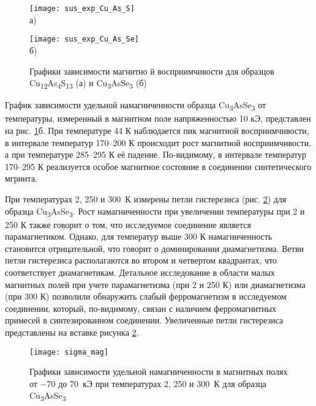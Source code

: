 \begin{figure}[p!]
  \begin{minipage}[ht]{0.9\linewidth}\centering
    \texttt{[image: sus\_exp\_Cu\_As\_S]} \\ а)
  \end{minipage}
 \vfill
  \begin{minipage}[ht]{0.9\linewidth}\centering
    \texttt{[image: sus\_exp\_Cu\_As\_Se]} \\ б)
  \end{minipage}
      \caption[Графики зависимости магнитно	й восприимчивости для образцов Cu\textsubscript{12}As\textsubscript{4}Se\textsubscript{13} (а) и Cu\textsubscript{3}AsS\textsubscript{3} (б)]{Графики зависимости магнитно	й восприимчивости для образцов Cu\textsubscript{12}As\textsubscript{4}S\textsubscript{13} (а) и Cu\textsubscript{3}AsSe\textsubscript{3} (б)}
    \label{img:magsus1}
\end{figure}

График зависимости удельной намагниченности образца Cu\textsubscript{3}AsSe\textsubscript{3} от температуры, измеренный в магнитном поле напряженностью 10 кЭ, представлен на рис. \ref{img:magsus1}б.
При температуре 44 К наблюдается пик магнитной восприимчивости, в интервале температур 170--200 К происходит рост магнитной восприимчивости, а при температуре 285--295 К её падение.
По-видимому, в интервале температур 170--295 К реализуется особое магнитное состояние в соединении синтетического мгриита.

При температурах 2, 250 и 300~К измерены петли гистерезиса (рис. \ref{img:magsus3}) для образца Cu\textsubscript{3}AsSe\textsubscript{3}.
Рост намагниченности при увеличении температуры при 2 и 250 К также говорит о
том, что исследуемое соединение является парамагнетиком.
Однако, для температур выше 300 К намагниченность становится отрицательной, что
говорит о доминировании диамагнетизма.
 Ветви петли гистерезиса располагаются во втором и четвертом квадрантах, что соответствует диамагнетикам.
Детальное исследование в области малых магнитных полей при учете парамагнетизма (при 2 и 250 К) или диамагнетизма (при 300 К) позволили обнаружить слабый ферромагнетизм в исследуемом соединении, который, по-видимому, связан с наличием ферромагнитных примесей в синтезированном соединении.
Увеличенные петли гистерезиса представлены на вставке рисунка \ref{img:magsus3}.



\begin{figure}[pt!]
  \begin{minipage}[ht]{0.9\linewidth}\centering
    \texttt{[image: sigma\_mag]} \\
  \end{minipage}

      \caption[Графики зависимости удельной намагниченности в магнитных полях от $-$70 до 70~кЭ при температурах 2, 250 и 300~К для образца Cu\textsubscript{3}AsSe\textsubscript{3}]{Графики зависимости удельной намагниченности в магнитных полях от $-$70 до 70~кЭ при температурах 2, 250 и 300~К для образца Cu\textsubscript{3}AsSe\textsubscript{3}}
    \label{img:magsus3}
\end{figure}


